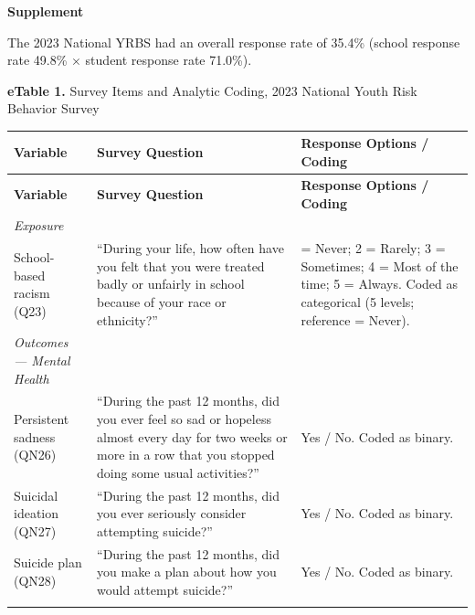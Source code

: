 \documentclass[12pt]{article}
\begin{document}
\begin{landscape}
\singlespacing
\noindent\textbf{Supplement}\par
\vspace{6pt}
\noindent The 2023 National YRBS had an overall response rate of 35.4\% (school response rate 49.8\% $\times$ student response rate 71.0\%).\cite{cdc2023yrbs}\par
\vspace{8pt}
\noindent\textbf{eTable 1.} Survey Items and Analytic Coding, 2023 National Youth Risk Behavior Survey\par
\vspace{6pt}
\footnotesize
\renewcommand{\arraystretch}{1.1}
\begin{longtable}{>{\raggedright\arraybackslash}p{2.2in} >{\raggedright\arraybackslash}p{4.0in} >{\raggedright\arraybackslash}p{2.8in}}
\toprule
\textbf{Variable} & \textbf{Survey Question} & \textbf{Response Options / Coding} \\
\midrule
\endfirsthead
\toprule
\textbf{Variable} & \textbf{Survey Question} & \textbf{Response Options / Coding} \\
\midrule
\endhead
\bottomrule
\endfoot

\textit{Exposure} \\
\addlinespace[2pt]

School-based racism (Q23) &
``During your life, how often have you felt that you were treated badly or unfairly
in school because of your race or ethnicity?'' &
1 = Never; 2 = Rarely; 3 = Sometimes; 4 = Most of the time; 5 = Always.
Coded as categorical (5 levels; reference = Never). \\

\addlinespace[6pt]
\textit{Outcomes --- Mental Health} \\
\addlinespace[2pt]

Persistent sadness (QN26) &
``During the past 12 months, did you ever feel so sad or hopeless almost every day for
two weeks or more in a row that you stopped doing some usual activities?'' &
Yes / No. Coded as binary. \\
\addlinespace[3pt]

Suicidal ideation (QN27) &
``During the past 12 months, did you ever seriously consider attempting suicide?'' &
Yes / No. Coded as binary. \\
\addlinespace[3pt]

Suicide plan (QN28) &
``During the past 12 months, did you make a plan about how you would attempt suicide?'' &
Yes / No. Coded as binary. \\
\addlinespace[3pt]


\end{longtable}
\end{landscape}
\end{document}

